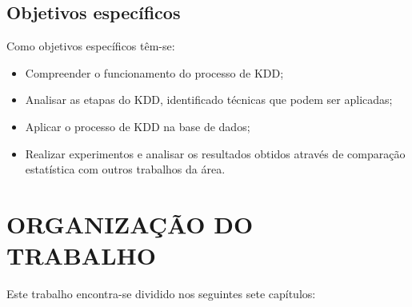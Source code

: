 \subsection{Objetivos específicos}
\label{subsec:objEspecificos}
Como objetivos específicos têm-se:
\begin{itemize}
	\item Compreender o funcionamento do processo de KDD;
	\item Analisar as etapas do KDD, identificado técnicas que podem ser aplicadas;
	\item Aplicar o processo de KDD na base de dados;
	\item Realizar experimentos e analisar os resultados obtidos através de comparação estatística com outros trabalhos da área.
\end{itemize}

\section{ORGANIZAÇÃO DO TRABALHO}
\label{sec:organizacaoTrabalho}
Este trabalho encontra-se dividido nos seguintes sete capítulos:

